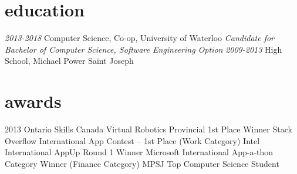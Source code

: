 \documentclass[]{friggeri-cv}
\begin{document}
\section{education}

\begin{entrylist}
  \entry
    {\emph{2013-2018}}
    {Computer Science, Co-op, University of Waterloo}
    { }
    {\emph{Candidate for Bachelor of Computer Science, Software Engineering Option}}
  \entry
    {\emph{2009-2013}}
    {High School, Michael Power Saint Joseph}
    {}
    {}
\end{entrylist}

\section{awards}
	2013 Ontario Skills Canada Virtual Robotics Provincial 1st Place Winner  Stack Overflow International App Contest – 1st Place (Work Category)  Intel International AppUp Round 1 Winner  Microsoft International App-a-thon Category Winner (Finance Category)  MPSJ Top Computer Science Student
	

% 
\end{document}
